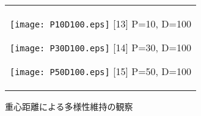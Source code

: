 \documentclass[a4paper,11pt,oneside,openany]{jsbook}
\begin{document}
\begin{figure}[htbp]
  \begin{center}
    \begin{tabular}{c}


      \begin{minipage}{0.33\hsize}
        \begin{center}
          \texttt{[image: P10D100.eps]}
          \hspace{1.2cm} [13] P=10, D=100
        \end{center}
      \end{minipage}

      \begin{minipage}{0.33\hsize}
        \begin{center}
          \texttt{[image: P30D100.eps]}
          \hspace{1.2cm} [14] P=30, D=100
        \end{center}
      \end{minipage}

      \begin{minipage}{0.33\hsize}
        \begin{center}
          \texttt{[image: P50D100.eps]}
          \hspace{1.2cm} [15] P=50, D=100
        \end{center}
      \end{minipage}
    \end{tabular}
    \caption{重心距離による多様性維持の観察}
    \label{fig:lena}
  \end{center}
\end{figure}
\end{document}

